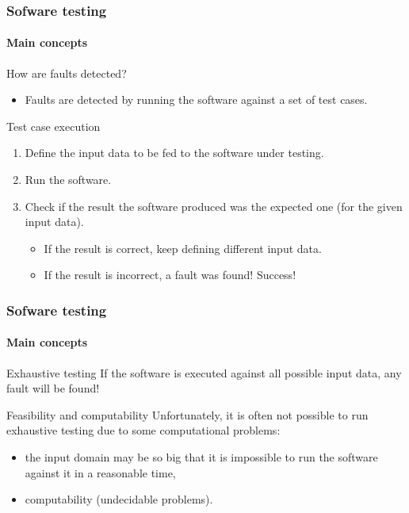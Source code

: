 \begin{frame}
\frametitle{Sofware testing}
\framesubtitle{Main concepts}

\begin{block:fact}{How are faults detected?}
\begin{itemize}
	\item Faults are detected by running the software against a set of test
	cases.
\end{itemize}
\end{block:fact}

\begin{block:procedure}{Test case execution}
\begin{enumerate}
	\item Define the input data to be fed to the software under testing.

	\item Run the software.

	\item Check if the result the software produced was the expected one (for
	the given input data).
	\begin{itemize}
		\item If the result is correct, keep defining different input data.

		\item If the result is incorrect, a fault was found! Success!
	\end{itemize}
\end{enumerate}
\end{block:procedure}
\end{frame}



\begin{frame}
\frametitle{Sofware testing}
\framesubtitle{Main concepts}

\begin{block:principle}{Exhaustive testing}
If the software is executed against all possible input data,
any fault will be found!
\end{block:principle}

\begin{block:fact}{Feasibility and computability}
Unfortunately, it is often not possible to run exhaustive testing due to
some computational problems:
\begin{itemize}
	\item the input domain may be so big that it is impossible to run the
	software against it in a reasonable time,

	\item computability (undecidable problems).
\end{itemize}
\end{block:fact}
\end{frame}


